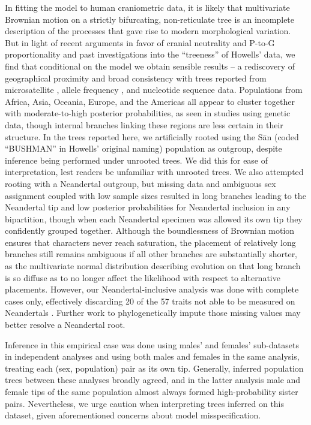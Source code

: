 \documentclass[10pt, twocolumn, twoside]{article}
\begin{document}
In fitting the model to human craniometric data, it is likely that multivariate Brownian motion on a strictly bifurcating, non-reticulate tree is an incomplete description of the processes that gave rise to modern morphological variation. But in light of recent arguments in favor of cranial neutrality and P-to-G proportionality and past investigations into the “treeness” of Howells’ data, we find that conditional on the model we obtain sensible results – a rediscovery of geographical proximity and broad consistency with trees reported from microsatellite \citep[e.g. ][]{pembertonPopulationStructureComprehensive2013}, allele frequency \citep[e.g. ][]{pickrellInferencePopulationSplits2012}, and nucleotide sequence \citep[e.g. ][]{liWorldwideHumanRelationships2008, mallickSimonsGenomeDiversity2016} data. Populations from Africa, Asia, Oceania, Europe, and the Americas all appear to cluster together with moderate-to-high posterior probabilities, as seen in studies using genetic data, though internal branches linking these regions are less certain in their structure. In the trees reported here, we artificially rooted using the Sān (coded “BUSHMAN” in Howells’ original naming) population as outgroup, despite inference being performed under unrooted trees. We did this for ease of interpretation, lest readers be unfamiliar with unrooted trees. We also attempted rooting with a Neandertal outgroup, but missing data and ambiguous sex assignment coupled with low sample sizes resulted in long branches leading to the Neandertal tip and low posterior probabilities for Neandertal inclusion in any bipartition, though when each Neandertal specimen was allowed its own tip they confidently grouped together. Although the boundlessness of Brownian motion ensures that characters never reach saturation, the placement of relatively long branches still remains ambiguous if all other branches are substantially shorter, as the multivariate normal distribution describing evolution on that long branch is so diffuse as to no longer affect the likelihood with respect to alternative placements. However, our Neandertal-inclusive analysis was done with complete cases only, effectively discarding 20 of the 57 traits not able to be measured on Neandertals \citep{weaverUnconstrainedCranialEvolution2015}. Further work to phylogenetically impute those missing values may better resolve a Neandertal root.

Inference in this empirical case was done using males' and females' sub-datasets in independent analyses and using both males and females in the same analysis, treating each (sex, population) pair as its own tip. Generally, inferred population trees between these analyses broadly agreed, and in the latter analysis male and female tips of the same population almost always formed high-probability sister pairs. Nevertheless, we urge caution when interpreting trees inferred on this dataset, given aforementioned concerns about model misspecification.
\end{document}
